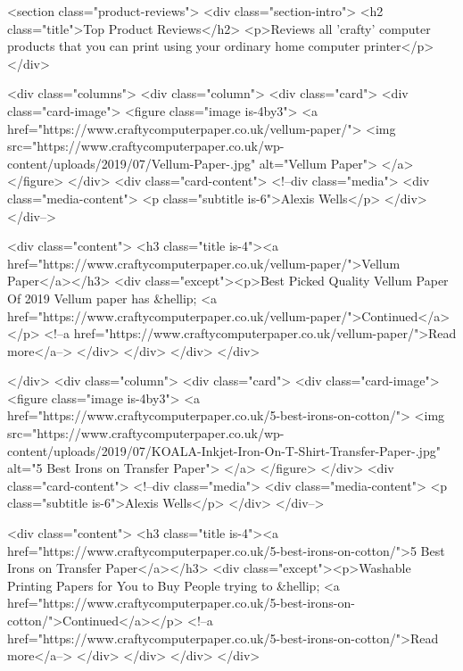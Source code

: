 <section class="product-reviews">
  <div class="section-intro">
    <h2 class="title">Top Product Reviews</h2>
    <p>Reviews all 'crafty' computer products that you can print using your ordinary home computer printer</p>
  </div>

  <div class="columns">
          <div class="column">
      <div class="card">
        <div class="card-image">
          <figure class="image is-4by3">
          <a href="https://www.craftycomputerpaper.co.uk/vellum-paper/">
                          <img src="https://www.craftycomputerpaper.co.uk/wp-content/uploads/2019/07/Vellum-Paper-.jpg" alt="Vellum Paper">
                      </a>
          </figure>
        </div>
        <div class="card-content">
          <!--div class="media">
            <div class="media-content">
              <p class="subtitle is-6">Alexis Wells</p>
            </div>
          </div-->

          <div class="content">
            <h3 class="title is-4"><a href="https://www.craftycomputerpaper.co.uk/vellum-paper/">Vellum Paper</a></h3>
            <div class="except"><p>Best Picked Quality Vellum Paper Of 2019 Vellum paper has &hellip; <a href="https://www.craftycomputerpaper.co.uk/vellum-paper/">Continued</a></p>
 <!--a href="https://www.craftycomputerpaper.co.uk/vellum-paper/">Read more</a--> </div>
          </div>
        </div>
      </div>

    </div>
          <div class="column">
      <div class="card">
        <div class="card-image">
          <figure class="image is-4by3">
          <a href="https://www.craftycomputerpaper.co.uk/5-best-irons-on-cotton/">
                          <img src="https://www.craftycomputerpaper.co.uk/wp-content/uploads/2019/07/KOALA-Inkjet-Iron-On-T-Shirt-Transfer-Paper-.jpg" alt="5 Best Irons on Transfer Paper">
                      </a>
          </figure>
        </div>
        <div class="card-content">
          <!--div class="media">
            <div class="media-content">
              <p class="subtitle is-6">Alexis Wells</p>
            </div>
          </div-->

          <div class="content">
            <h3 class="title is-4"><a href="https://www.craftycomputerpaper.co.uk/5-best-irons-on-cotton/">5 Best Irons on Transfer Paper</a></h3>
            <div class="except"><p>Washable Printing Papers for You to Buy People trying to &hellip; <a href="https://www.craftycomputerpaper.co.uk/5-best-irons-on-cotton/">Continued</a></p>
 <!--a href="https://www.craftycomputerpaper.co.uk/5-best-irons-on-cotton/">Read more</a--> </div>
          </div>
        </div>
      </div>

